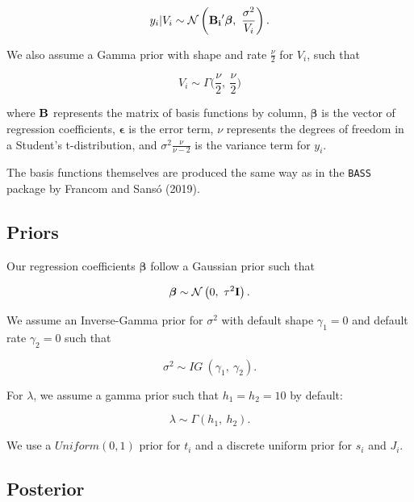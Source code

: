 \documentclass[
]{article}
\begin{document}
\begin{equation}
\label{3}
y_i | V_i \sim \mathcal{N}\left({\bf B_{i}}'\boldsymbol{\beta}, ~ \frac{\sigma^2}{V_i}\right).
\end{equation}

We also assume a Gamma prior with shape and rate \(\frac{\nu}{2}\) for
\(V_i\), such that

\begin{equation}
\label{vi}
V_i \sim \Gamma \bigg(\frac{\nu}{2}, ~\frac{\nu}{2}\bigg)
\end{equation}

where \({\bf B}\) represents the matrix of basis functions by column,
\(\boldsymbol \beta\) is the vector of regression coefficients,
\(\boldsymbol\epsilon\) is the error term, \(\nu\) represents the
degrees of freedom in a Student's t-distribution, and
\(\sigma^2\frac{\nu}{\nu - 2}\) is the variance term for \(y_i\).

The basis functions themselves are produced the same way as in the
\texttt{BASS} package by Francom and Sansó (2019).

\hypertarget{priors}{%
\subsection{Priors}\label{priors}}

Our regression coefficients \(\boldsymbol\beta\) follow a Gaussian prior
such that

\begin{equation}
\label{8}
\boldsymbol\beta \sim \mathcal{N} \left( 0,~\tau^2 {\bf I} \right).
\end{equation}

We assume an Inverse-Gamma prior for \(\sigma^2\) with default shape
\(\gamma_1 = 0\) and default rate \(\gamma_2=0\) such that

\begin{equation}
\label{s2}
\sigma^2 \sim IG~(\gamma_1,~\gamma_2).
\end{equation}

For \(\lambda\), we assume a gamma prior such that \(h_1 = h_2= 10\) by
default:

\begin{equation}
\label{lamprior}
\lambda \sim \Gamma \left(h_1, ~h_2\right).
\end{equation}

We use a \(Uniform(0,1)\) prior for \(t_i\) and a discrete uniform prior
for \(s_i\) and \(J_i\).

\hypertarget{posterior}{%
\subsection{Posterior}\label{posterior}}
\end{document}
